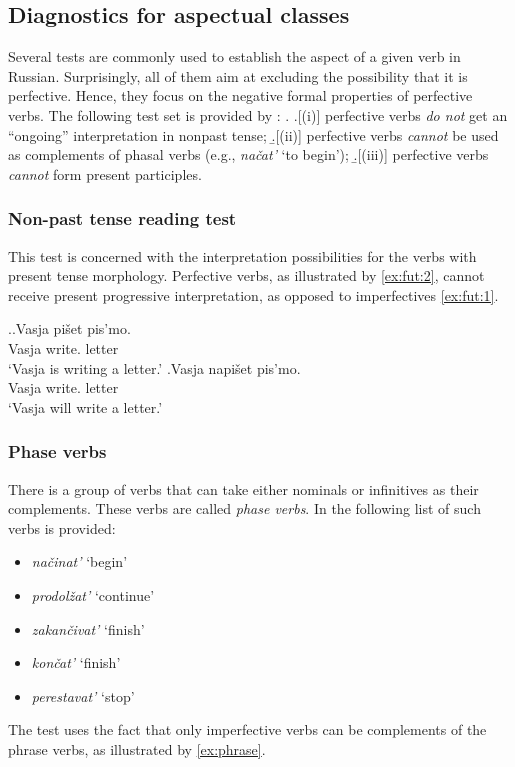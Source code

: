 \subsection{Diagnostics for aspectual classes}\label{sec:tests:old}
Several tests are commonly used to establish the aspect of a given verb in Russian. Surprisingly, all of them aim at excluding the possibility that it is perfective. Hence, they focus on the negative formal properties of perfective verbs. The following test set is provided by \citet{Schoorlemmer:95}: 
\ex.\label{tests} \a.[(i)] \label{sttest1} perfective verbs \textit{do not} get an ``ongoing'' interpretation in nonpast tense; 
\b.[(ii)] \label{sttest2} perfective verbs \textit{cannot} be used as complements of phasal verbs (e.g., \textit{na\v{c}at'} `to begin'); 
\b.[(iii)] \label{sttest3} perfective verbs \textit{cannot} form present participles.

\subsubsection{Non-past tense reading test}
This test is concerned with the interpretation possibilities for the verbs with present tense morphology. Perfective verbs, as illustrated by \ref{ex:fut:2}, cannot receive present progressive interpretation, as opposed to imperfectives \ref{ex:fut:1}.

\ex.\label{ex:fut}\ag.\label{ex:fut:1}Vasja pi\v{s}et\textsuperscript{\IPF} pis'mo.\\
Vasja write. letter\\
`Vasja is writing a letter.'
\bg.\label{ex:fut:2}Vasja napi\v{s}et\textsuperscript{\PF} pis'mo.\\
Vasja write. letter\\
`Vasja will write a letter.'
 
\subsubsection{Phase verbs}
There is a group of verbs that can take either nominals or infinitives as their complements. These verbs are called \textit{phase verbs}. In \cite{Borik:02} the following list of such verbs is provided:
\begin{itemize}[noitemsep]
\item \textit{na\v{c}inat'} `begin'
\item \textit{prodol\v{z}at'} `continue'
\item \textit{zakan\v{c}ivat'} `finish'
\item \textit{kon\v{c}at'} `finish'
\item \textit{perestavat'} `stop'
\end{itemize}
The test uses the fact that only imperfective verbs can be complements of the phrase verbs, as illustrated by \ref{ex:phrase}.


